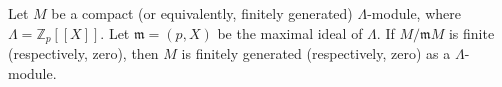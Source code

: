 Let $M$ be a compact (or equivalently, finitely generated) $\Lambda$-module, where $\Lambda = \mathbb{Z}_p[[X]]$. Let $\mathfrak{m} = (p, X)$ be the maximal ideal of $\Lambda$. If $M/\mathfrak{m}M$ is finite (respectively, zero), then $M$ is finitely generated (respectively, zero) as a $\Lambda$-module.

